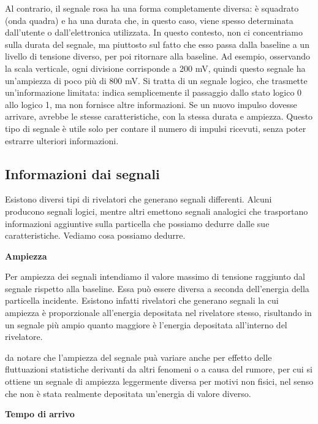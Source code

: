 Al contrario, il segnale rosa ha una forma completamente diversa: è squadrato (onda quadra) e ha una durata che, in questo caso, viene spesso determinata dall'utente o dall'elettronica utilizzata. In questo contesto, non ci concentriamo sulla durata del segnale, ma piuttosto sul fatto che esso passa dalla baseline a un livello di tensione diverso, per poi ritornare alla baseline. Ad esempio, osservando la scala verticale, ogni divisione corrisponde a 200 mV, quindi questo segnale ha un'ampiezza di poco più di 800 mV. Si tratta di un segnale logico, che trasmette un'informazione limitata: indica semplicemente il passaggio dallo stato logico 0 allo logico 1, ma non fornisce altre informazioni. Se un nuovo impulso dovesse arrivare, avrebbe le stesse caratteristiche, con la stessa durata e ampiezza. Questo tipo di segnale è utile solo per contare il numero di impulsi ricevuti, senza poter estrarre ulteriori informazioni.

\subsection{Informazioni dai segnali}

Esistono diversi tipi di rivelatori che generano segnali differenti. Alcuni producono segnali logici, mentre altri emettono segnali analogici che trasportano informazioni aggiuntive sulla particella che possiamo dedurre dalle sue caratteristiche. Vediamo cosa possiamo dedurre.

\vspace{0.2cm}\textbf{Ampiezza}

Per ampiezza dei segnali intendiamo il valore massimo di tensione raggiunto dal segnale rispetto alla baseline. Essa può essere diversa a seconda dell'energia della particella incidente. Esistono infatti rivelatori che generano segnali la cui ampiezza è proporzionale all'energia depositata nel rivelatore stesso, risultando in un segnale più ampio quanto maggiore è l'energia depositata all'interno del rivelatore.

\E da notare che l'ampiezza del segnale puà variare anche per effetto delle fluttuazioni statistiche derivanti da altri fenomeni o a causa del rumore, per cui si ottiene un segnale di ampiezza leggermente diversa per motivi non fisici, nel senso che non è stata realmente depositata un'energia di valore diverso.

\vspace{0.2cm}\textbf{Tempo di arrivo}

